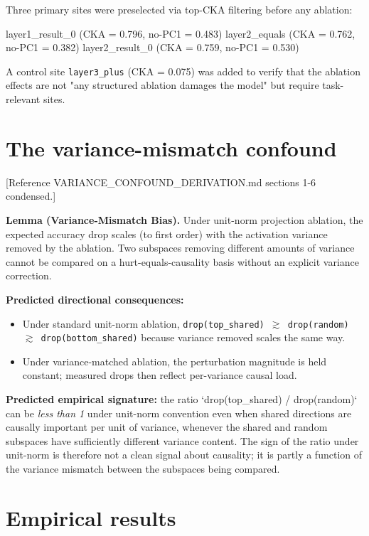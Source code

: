 Three primary sites were preselected via top-CKA filtering before any
ablation:

  layer1\_result\_0 (CKA = 0.796, no-PC1 = 0.483)
  layer2\_equals   (CKA = 0.762, no-PC1 = 0.382)
  layer2\_result\_0 (CKA = 0.759, no-PC1 = 0.530)

A control site \texttt{layer3\_plus} (CKA = 0.075) was added to verify that the
ablation effects are not "any structured ablation damages the model" but
require task-relevant sites.


\section{The variance-mismatch confound}

[Reference VARIANCE\_CONFOUND\_DERIVATION.md sections 1-6 condensed.]

\textbf{Lemma (Variance-Mismatch Bias).} Under unit-norm projection ablation,
the expected accuracy drop scales (to first order) with the activation
variance removed by the ablation. Two subspaces removing different
amounts of variance cannot be compared on a hurt-equals-causality basis
without an explicit variance correction.

\textbf{Predicted directional consequences:}

\begin{itemize}
  \item Under standard unit-norm ablation, \texttt{drop(top\_shared) $\gtrsim$ drop(random) $\gtrsim$ drop(bottom\_shared)} because variance removed scales the same way.
  \item Under variance-matched ablation, the perturbation magnitude is held constant; measured drops then reflect per-variance causal load.
\end{itemize}

\textbf{Predicted empirical signature:} the ratio `drop(top\_shared) /
drop(random)` can be \emph{less than 1} under unit-norm convention even when
shared directions are causally important per unit of variance, whenever
the shared and random subspaces have sufficiently different variance
content. The sign of the ratio under unit-norm is therefore not a clean
signal about causality; it is partly a function of the variance mismatch
between the subspaces being compared.


\section{Empirical results}

